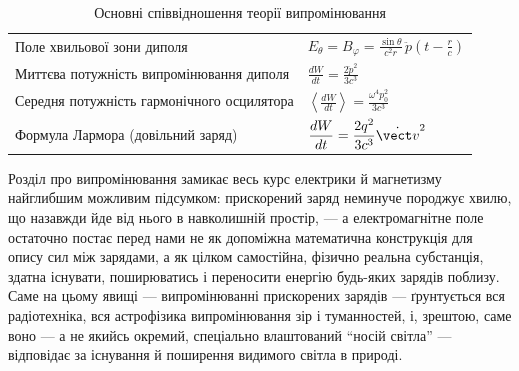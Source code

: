 \begin{table}[h!]\small\centering
	\caption{Основні співвідношення теорії випромінювання}
	\begin{tabular}{ll}
		\toprule
		Поле хвильової зони диполя      & $\displaystyle E_\theta = B_\varphi = \frac{\sin\theta}{c^2r}\,\ddot p\!\left(t-\frac rc\right)$ \\
		Миттєва потужність випромінювання диполя & $\displaystyle \frac{dW}{dt} = \frac{2\ddot p^2}{3c^3}$                                 \\
		Середня потужність гармонічного осцилятора & $\displaystyle \left\langle\frac{dW}{dt}\right\rangle = \frac{\omega^4p_0^2}{3c^3}$     \\
		Формула Лармора (довільний заряд) & $\displaystyle \frac{dW}{dt} = \frac{2q^2}{3c^3}\dot{\vect v}^2$                                \\
		\bottomrule
	\end{tabular}
\end{table}

\begin{Attention}
	Розділ про випромінювання замикає весь курс електрики й магнетизму найглибшим можливим підсумком:  прискорений заряд
	неминуче породжує хвилю, що назавжди йде від нього в навколишній простір, --- а електромагнітне поле остаточно постає перед нами не як
	допоміжна математична конструкція для опису сил між зарядами, а як цілком самостійна, фізично реальна субстанція, здатна існувати,
	поширюватись і переносити енергію  будь-яких зарядів поблизу. Саме на цьому явищі --- випромінюванні прискорених зарядів ---
	ґрунтується вся радіотехніка, вся астрофізика випромінювання зір і туманностей, і, зрештою, саме воно --- а не якийсь окремий, спеціально
	влаштований \enquote{носій світла} --- відповідає за існування й поширення видимого світла в природі.
\end{Attention}
